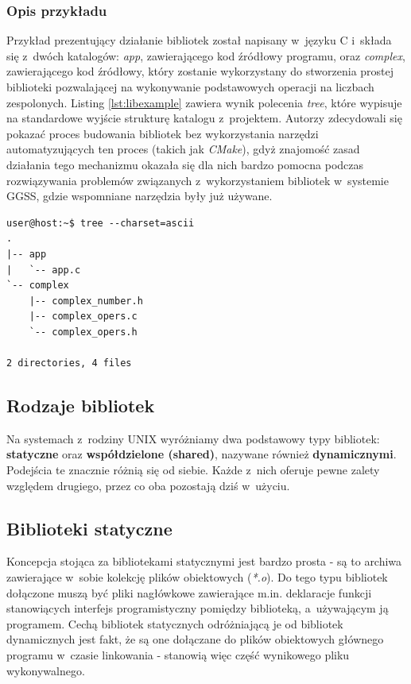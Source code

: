\subsubsection*{Opis przykładu}
Przykład prezentujący działanie bibliotek został napisany w~języku C i~składa się z~dwóch katalogów: \textit{app}, zawierającego kod źródłowy programu, oraz \textit{complex}, zawierającego kod źródłowy, który zostanie wykorzystany do stworzenia prostej biblioteki pozwalającej na wykonywanie podstawowych operacji na liczbach zespolonych. Listing \ref{lst:libexample} zawiera wynik polecenia \textit{tree}, które wypisuje na standardowe wyjście strukturę katalogu z~projektem. Autorzy zdecydowali się pokazać proces budowania bibliotek bez wykorzystania narzędzi automatyzujących ten proces (takich jak \textit{CMake}), gdyż znajomość zasad działania tego mechanizmu okazała się dla nich bardzo pomocna podczas rozwiązywania problemów związanych z~wykorzystaniem bibliotek w~systemie GGSS, gdzie wspomniane narzędzia były już używane.

\begin{lstlisting}[language=Cmd, caption={Struktura katalogów projektu stanowiącego bazę przykładu dotyczącego bibliotek.},label={lst:libexample}]
user@host:~$ tree --charset=ascii
.
|-- app
|   `-- app.c
`-- complex
    |-- complex_number.h
    |-- complex_opers.c
    `-- complex_opers.h

2 directories, 4 files
\end{lstlisting}


\subsection{Rodzaje bibliotek}
Na systemach z~rodziny UNIX wyróżniamy dwa podstawowy typy bibliotek: \textbf{statyczne} oraz \textbf{współdzielone (shared)}, nazywane również \textbf{dynamicznymi}. Podejścia te znacznie różnią się od siebie. Każde z~nich oferuje pewne zalety względem drugiego, przez co oba pozostają dziś w~użyciu.



\subsection{Biblioteki statyczne}
Koncepcja stojąca za bibliotekami statycznymi jest bardzo prosta \cite{Compiling} - są to archiwa zawierające w~sobie kolekcję plików obiektowych (\textit{*.o}). Do tego typu bibliotek dołączone muszą być pliki nagłówkowe zawierające m.in. deklaracje funkcji stanowiących interfejs programistyczny pomiędzy biblioteką, a~używającym ją programem. Cechą bibliotek statycznych odróżniającą je od bibliotek dynamicznych jest fakt, że są one dołączane do plików obiektowych głównego programu w~czasie linkowania - stanowią więc część wynikowego pliku wykonywalnego. 



